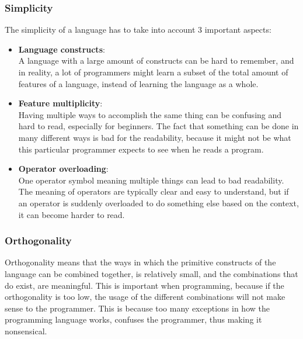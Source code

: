 \subsubsection{Simplicity}
The simplicity of a language has to take into account 3 important aspects:
\begin{itemize}
    \item \textbf{Language constructs}:\\
     A language with a large amount of constructs can be hard to remember, and in reality, a lot of programmers might learn a subset of the total amount of features of a language, instead of learning the language as a whole.
    \item \textbf{Feature multiplicity}:\\
     Having multiple ways to accomplish the same thing can be confusing and hard to read, especially for beginners. The fact that something can be done in many different ways is bad for the readability, because it might not be what this particular programmer expects to see when he reads a program.
    \item \textbf{Operator overloading}:\\
    One operator symbol meaning multiple things can lead to bad readability. The meaning of operators are typically clear and easy to understand, but if an operator is suddenly overloaded to do something else based on the context, it can become harder to read.
\end{itemize}
\subsubsection{Orthogonality}
Orthogonality means that the ways in which the primitive constructs of the language can be combined together, is relatively small, and the combinations that do exist, are meaningful. This is important when programming, because if the orthogonality is too low, the usage of the different combinations will not make sense to the programmer. This is because too many exceptions in how the programming language works, confuses the programmer, thus making it nonsensical. 
